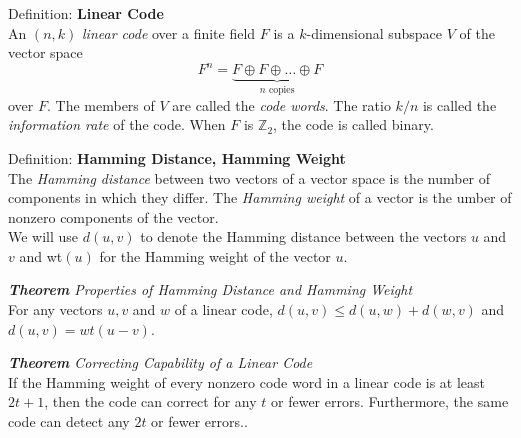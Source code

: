\documentclass{article}
\newcommand{\Z}{\mathbb{Z}}
\begin{document}
Definition: \textbf{Linear Code}\\ An $(n,k)$ \textit{linear code} over a finite field $F$ is a $k$-dimensional subspace $V$ of the vector space \[F^n = \underbrace{F\oplus F\oplus \dots \oplus F}_{\text{$n$ copies}}\]
over $F$. The members of $V$ are called the \textit{code words}. The ratio $k/n$ is called the \textit{information rate} of the code. When $F$ is $\Z_2$, the code is called binary.

Definition: \textbf{Hamming Distance, Hamming Weight}\\The \textit{Hamming distance} between two vectors of a vector space is the number of components in which they differ. The \textit{Hamming weight} of a vector is the umber of nonzero components of the vector.\\ We will use $d(u,v)$ to denote the Hamming distance between the vectors $u$ and $v$ and wt$(u)$ for the Hamming weight of the vector $u$.

\textit{\textbf{Theorem} Properties of Hamming Distance and Hamming Weight}\\
For any vectors $u,v$ and $w$ of a linear code, $d(u,v)\leq d(u,w)+d(w,v)$ and $d(u,v)=wt(u-v)$.

\textit{\textbf{Theorem} Correcting Capability of a Linear Code}\\
If the Hamming weight of every nonzero code word in a linear code is at least $2t+1$, then the code can correct for any $t$ or fewer errors. Furthermore, the same code can detect any $2t$ or fewer errors..
\end{document}
